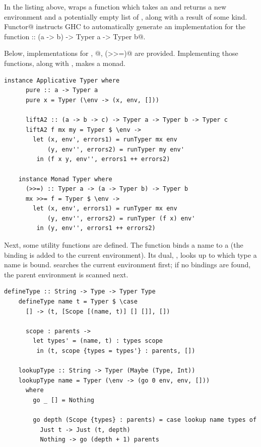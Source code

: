 \documentclass[UdineBachThesis,american,11pt]{PhdThesis}
\begin{document}
  In the listing above, \lstinline@Typer@ wraps a function which takes an
  \lstinline@Environment@ and returns a new environment and a potentially empty
  list of \lstinline@Error@s, along with a result of some kind.
  \lstinline@deriving Functor@ instructs GHC to automatically generate an
  implementation for the function
  \lstinline@fmap :: (a -> b) -> Typer a -> Typer b@.

  Below, implementations for \lstinline@pure@, @,
  \lstinline@(>>=)@ are provided. Implementing those functions, along with
  \lstinline@fmap@, makes \lstinline@Typer@ a monad.

  \begin{lstlisting}[gobble=4,basicstyle=\ttfamily\small]
    instance Applicative Typer where
      pure :: a -> Typer a
      pure x = Typer (\env -> (x, env, []))

      liftA2 :: (a -> b -> c) -> Typer a -> Typer b -> Typer c
      liftA2 f mx my = Typer $ \env ->
        let (x, env', errors1) = runTyper mx env
            (y, env'', errors2) = runTyper my env'
         in (f x y, env'', errors1 ++ errors2)

    instance Monad Typer where
      (>>=) :: Typer a -> (a -> Typer b) -> Typer b
      mx >>= f = Typer $ \env ->
        let (x, env', errors1) = runTyper mx env
            (y, env'', errors2) = runTyper (f x) env'
         in (y, env'', errors1 ++ errors2)
  \end{lstlisting}

  Next, some utility functions are defined. The function \lstinline@defineType@
  binds a name to a \lstinline@Type@ (the binding is added to the current
  environment). Its dual, \lstinline@lookupType@, looks up to which type a name
  is bound. \lstinline@lookupType@ searches the current environment first; if no
  bindings are found, the parent environment is scanned next.

  \begin{lstlisting}[gobble=4,basicstyle=\ttfamily\small]
    defineType :: String -> Type -> Typer Type
    defineType name t = Typer $ \case
      [] -> (t, [Scope [(name, t)] [] []], [])

      scope : parents ->
        let types' = (name, t) : types scope
         in (t, scope {types = types'} : parents, [])

    lookupType :: String -> Typer (Maybe (Type, Int))
    lookupType name = Typer (\env -> (go 0 env, env, []))
      where
        go _ [] = Nothing

        go depth (Scope {types} : parents) = case lookup name types of
          Just t -> Just (t, depth)
          Nothing -> go (depth + 1) parents
  \end{lstlisting}
\end{document}
